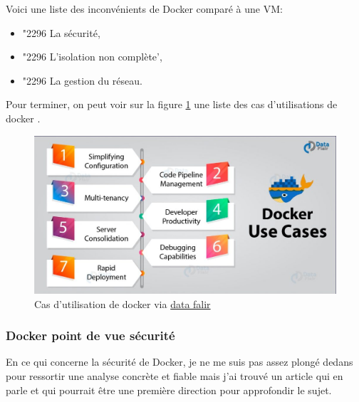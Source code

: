 \documentclass[
    iai, %
    il, %
]{heig-tb}
\begin{document}
Voici une liste des inconvénients de Docker comparé à une VM:
\begin{itemize}
    \item \char"2296 La sécurité, \cite{koukia}
    \item \char"2296 L'isolation non complète', \cite{koukia}
    \item \char"2296 La gestion du réseau. \cite{koukia}
\end{itemize}

Pour terminer, on peut voir sur la figure \ref{docker-use-cases} une liste des cas d'utilisations de docker \cite{data-flair-use-cases}.

\begin{center}
    \begin{figure}
        \includegraphics[width=\textwidth]{./assets/figures/docker-use-cases.jpg}
        \caption[Cas d'utilisation de docker]{Cas d'utilisation de docker via \href{https://data-flair.training/blogs/wp-content/uploads/sites/2/2018/10/}{data falir}
            \label{docker-use-cases}}
    \end{figure}
\end{center}

\subsubsection{Docker point de vue sécurité}
En ce qui concerne la sécurité de Docker, je ne me suis pas assez plongé dedans pour ressortir une
analyse concrète et fiable mais j'ai trouvé un article \cite{combe} qui en parle et qui pourrait
être une première direction pour approfondir le sujet.

\end{document}
